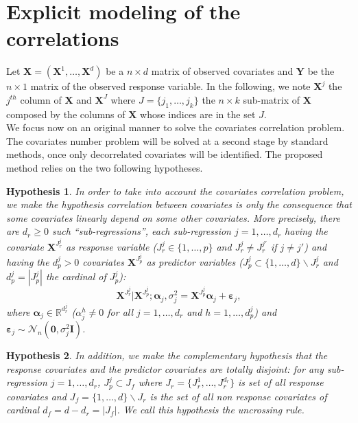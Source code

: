 \documentclass[12pt,a4paper]{report}
\newtheorem{hyp}{Hypothesis}
\begin{document}
\section{Explicit modeling of the correlations}
	Let $\boldsymbol{X}=(\boldsymbol{X}^1,\dots,\boldsymbol{X}^d)$ be a $n \times d$ matrix of observed covariates and $\boldsymbol{Y}$ be the $n \times 1$ matrix of the observed response variable. In the following, we note $\boldsymbol{X}^j$ the $j^{th}$ column of $\boldsymbol{X}$ and $\boldsymbol{X}^{J}$ where $J=\{j_1,\dots,j_k\}$ the $n\times k$ sub-matrix of $\boldsymbol{X}$ composed by the columns of $\boldsymbol{X}$ whose indices are in the set $J$. 
\\




We focus now on an original manner to solve the covariates correlation problem. The covariates number problem will be solved at a second stage by standard methods, once only decorrelated covariates will be identified. The proposed method relies on the two following hypotheses.

\begin{hyp}\label{H1}
In order to take into account the covariates correlation problem, we make the hypothesis correlation between covariates is {\it only} the consequence that some covariates {\it linearly} depend on some other covariates. More precisely, there are $d_{r}\geq 0$ such ``sub-regressions'', each sub-regression $j=1,\ldots,d_{r}$ having the covariate $\boldsymbol{X}^{J_{r}^j}$ as {\it response} variable ($J_{r}^j\in\{1,\ldots,p\}$ and $J_{r}^j\neq J_{r}^{j'}$ if $j\neq j'$) and having the $d_p^j>0$ covariates $\boldsymbol{X}^{J_{p}^j}$  as {\it predictor} variables ($J_{p}^j\subset\{1,\ldots,d\} \backslash J_{r}^j$ and $d_p^j=|J_{p}^j|$ the cardinal of $J_{p}^j$):
\begin{equation}
\boldsymbol{X}^{J_{r}^j}|\boldsymbol{X}^{J_{p}^j};\boldsymbol{\alpha}_j,\sigma^2_j=\boldsymbol{X}^{J_{p}^j}\boldsymbol{\alpha}_j+\boldsymbol{\varepsilon}_j, \label{eq:SR}
\end{equation}
where $\boldsymbol{\alpha}_j\in{\mathbb{R}^{d_r^j}}$ (${\alpha}_j^h\neq 0$ for all $j=1,\ldots,d_r$ and $h=1,\ldots,d_p^j$) and $\boldsymbol{\varepsilon}_j \sim\mathcal{N}_n(\boldsymbol{0},\sigma^2_j\boldsymbol{I})$.
\end{hyp}

\begin{hyp}\label{H2}
In addition, we make the complementary hypothesis that the response covariates and the predictor covariates are totally disjoint: for any sub-regression $j=1,\ldots,d_{r}$, $J_{p}^j\subset J_f$ where $J_{r}=\{J_{r}^1,\ldots,J_{r}^{d_r}\}$ is set of all response covariates and $J_f=\{1,\ldots,d\} \backslash J_{r}$ is the set of all {\it non} response covariates of cardinal $d_f=d-d_r=|J_f|$. We call this hypothesis the uncrossing rule.
\end{hyp}
\end{document}
